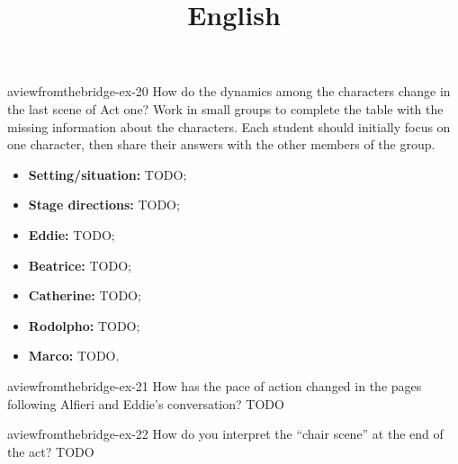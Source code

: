 \documentclass[preview]{standalone}
\begin{document}
\title{English}
\genpage

\begin{snippetexercise}{aviewfromthebridge-ex-20}
{How do the dynamics among the characters change in the last scene of Act one? Work in small
groups to complete the table with the missing information about the characters. Each student
should initially focus on one character, then share their answers with the other members of the
group.}
\begin{itemize}
    \item \textbf{Setting/situation:} TODO;
    \item \textbf{Stage directions:} TODO;
    \item \textbf{Eddie:} TODO;
    \item \textbf{Beatrice:} TODO;
    \item \textbf{Catherine:} TODO;
    \item \textbf{Rodolpho:} TODO;
    \item \textbf{Marco:} TODO.
\end{itemize}
\end{snippetexercise}

\begin{snippetexercise}{aviewfromthebridge-ex-21}
{How has the pace of action changed in the pages following Alfieri and Eddie's conversation?}
TODO
\end{snippetexercise}

\begin{snippetexercise}{aviewfromthebridge-ex-22}
{How do you interpret the “chair scene” at the end of the act?}
TODO
\end{snippetexercise}
\end{document}
